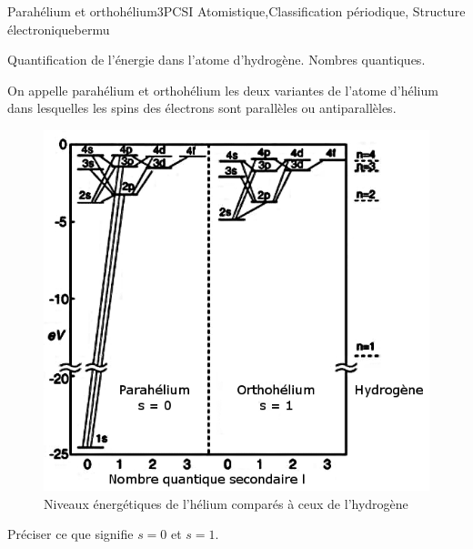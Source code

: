 
\begin{exercise}{Parahélium et orthohélium}{3}{PCSI}
{Atomistique,Classification périodique, Structure électronique}{bermu}



\begin{questions}
    \questioncours Quantification de l'énergie dans l'atome d'hydrogène. Nombres quantiques.

\begin{EnvUplevel}
On appelle parahélium et orthohélium les deux variantes de l'atome d'hélium dans lesquelles les spins des électrons sont parallèles ou antiparallèles.
 
    \begin{figure}[H]
        \centering
        \includegraphics[scale=.7]{chimiePC/atomes/helium.png}
        \caption{Niveaux énergétiques de l'hélium comparés à ceux de l'hydrogène}
    \end{figure}
    
\end{EnvUplevel}
    \question Préciser ce que signifie $s= 0$ et $s = 1$.
    

\end{questions}
\end{exercise}
